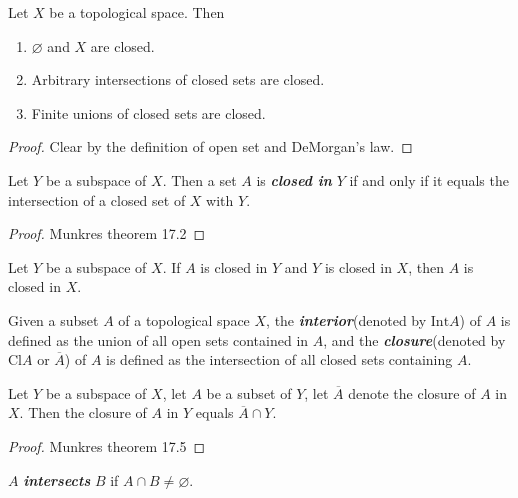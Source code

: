 \begin{mytheorem}
Let $X$ be a topological space. Then
\begin{enumerate}[label={(\alph*)}]
\item $\varnothing$ and $X$ are closed.
\item Arbitrary intersections of closed sets are closed.
\item Finite unions of closed sets are closed.
\end{enumerate}
\end{mytheorem}
\begin{proof}
Clear by the definition of open set and DeMorgan's law.
\end{proof}

\begin{mytheorem}
Let $Y$ be a subspace of $X$. Then a set $A$ is \textbf{\emph{closed in}} $Y$ if and only if it equals the intersection of a closed set of $X$ with $Y$.
\end{mytheorem}
\begin{proof}
Munkres theorem 17.2
\end{proof}

\begin{myproposition}
Let $Y$ be a subspace of $X$. If $A$ is closed in $Y$ and $Y$ is closed in $X$, then $A$ is closed in $X$.
\end{myproposition}

\begin{mydefinition}
Given a subset $A$ of a topological space $X$, the \textbf{\emph{interior}}(denoted by $\text{Int} A$) of $A$ is defined as the union of all open sets contained in $A$, and the \textbf{\emph{closure}}(denoted by $\text{Cl} A$ or $\overline{A}$) of $A$ is defined as the intersection of all closed sets containing $A$.
\end{mydefinition}

\begin{mytheorem}
Let $Y$ be a subspace of $X$, let $A$ be a subset of $Y$, let $\overline{A}$ denote the closure of $A$ in $X$. Then the closure of $A$ in $Y$ equals $\overline{A}\cap Y$.
\end{mytheorem}
\begin{proof}
Munkres theorem 17.5
\end{proof}

\begin{notebox}
$A$ \textbf{\emph{intersects}} $B$ if $A\cap B\neq \varnothing$.
\end{notebox}

